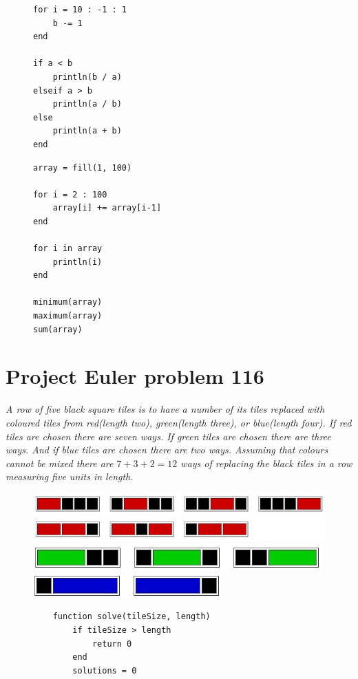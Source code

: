\documentclass[landscape, a0]{sciposter}
\begin{document}
\begin{multicols}{3}
\begin{multicols}{3}
\begin{figure}[H]
\begin{lstlisting}[frame=none, numbers=none]
for i = 10 : -1 : 1
	b -= 1
end

if a < b
	println(b / a)
elseif a > b
	println(a / b)
else
	println(a + b)
end
		\end{lstlisting}
	\end{figure}
	\hfill
	\begin{figure}[H]
\begin{lstlisting}[frame=none, numbers=none]
array = fill(1, 100)

for i = 2 : 100
	array[i] += array[i-1]
end

for i in array
	println(i)
end

minimum(array)
maximum(array)
sum(array)
		\end{lstlisting}
	\end{figure}
\end{multicols}
\section{Project Euler problem 116}
\textit{A row of five black square tiles is to have a number of its tiles replaced with coloured tiles from red(length two), green(length three), or blue(length four). If red tiles are chosen there are seven ways. If green tiles are chosen there are three ways. And if blue tiles are chosen there are two ways. Assuming that colours cannot be mixed there are $7+3+2=12$ ways of replacing the black tiles in a row measuring five units in length.}
\hspace*{-1in}
\begin{figure}[H]
	\centering
	\includegraphics[scale=1.635]{fig/1161.jpg}
	\includegraphics[scale=2.2]{fig/1162.jpg} 
	\includegraphics[scale=2.2]{fig/1163.jpg} 
\end{figure}
\begin{figure}[H]
	\centering
	\begin{lstlisting}
	function solve(tileSize, length)
		if tileSize > length
			return 0
		end
		solutions = 0
	

\end{lstlisting}
\end{figure}
\end{multicols}
\end{document}
